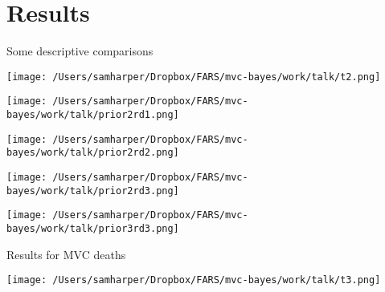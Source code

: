 \documentclass[english]{beamer}\usepackage[]{graphicx}\usepackage[]{color}
\begin{document}
\section{Results}
\begin{frame}[plain]{Some descriptive comparisons}
\begin{center}
\texttt{[image: /Users/samharper/Dropbox/FARS/mvc-bayes/work/talk/t2.png]}
\par\end{center}

\end{frame}
%
\begin{frame}[plain]{}
\begin{center}
\texttt{[image: /Users/samharper/Dropbox/FARS/mvc-bayes/work/talk/prior2rd1.png]}
\par\end{center}

\end{frame}
%
\begin{frame}[plain]{}
\begin{center}
\texttt{[image: /Users/samharper/Dropbox/FARS/mvc-bayes/work/talk/prior2rd2.png]}
\par\end{center}

\end{frame}
%
\begin{frame}[plain]{}
\begin{center}
\texttt{[image: /Users/samharper/Dropbox/FARS/mvc-bayes/work/talk/prior2rd3.png]}
\par\end{center}

\end{frame}
%
\begin{frame}[plain]{}
\begin{center}
\texttt{[image: /Users/samharper/Dropbox/FARS/mvc-bayes/work/talk/prior3rd3.png]}
\par\end{center}

\end{frame}
%
\begin{frame}[plain]{Results for MVC deaths}
\begin{center}
\texttt{[image: /Users/samharper/Dropbox/FARS/mvc-bayes/work/talk/t3.png]}
\par\end{center}

\end{frame}
\end{document}
